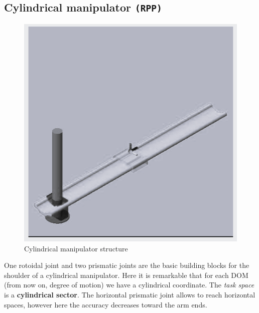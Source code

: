 \subsection{Cylindrical manipulator \texttt{(RPP)}}
\begin{multicols}{2}
    \begin{figure}[H]
        \centering
        \includegraphics[scale=0.5]{img/cyl_man.png}
        \caption{Cylindrical manipulator structure}
    \end{figure}
    One rotoidal joint and two prismatic joints are the basic building blocks for the shoulder of a cylindrical manipulator. Here it is remarkable that for each DOM (from now on, degree of  motion) we have a cylindrical coordinate. The \textit{task space} is a \textbf{cylindrical sector}. The horizontal prismatic joint allows  to reach horizontal spaces, however here the accuracy decreases toward the arm ends.
\end{multicols}
\newpage

